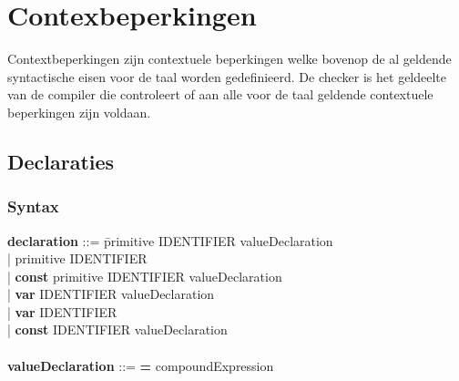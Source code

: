 \chapter{Contexbeperkingen}
Contextbeperkingen zijn contextuele beperkingen welke bovenop de al geldende syntactische eisen voor de taal worden gedefinieerd. De checker is het geldeelte van de compiler die controleert of aan alle voor de taal geldende contextuele beperkingen zijn voldaan.

\section{Declaraties}
    \subsection{Syntax}    
        \begin{tabbing}
            {\bf declaration}         ::= \=primitive IDENTIFIER valueDeclaration\\
                                      \>| primitive IDENTIFIER\\
                                      \>| \textbf{const} primitive IDENTIFIER valueDeclaration\\
                                      \>| \textbf{var} IDENTIFIER valueDeclaration\\
                                      \>| \textbf{var} IDENTIFIER\\
                                      \>| \textbf{const} IDENTIFIER valueDeclaration\\
            \\
            {\bf valueDeclaration}    ::= \textbf{=} compoundExpression\\
        \end{tabbing}
